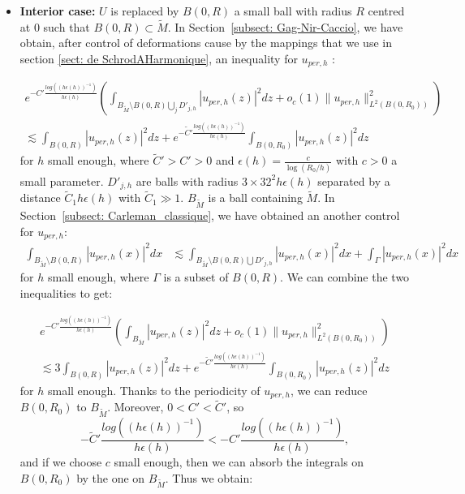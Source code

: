 \documentclass[leqno,11pt,letterpaper, english]{amsart}
\theoremstyle{plain}
\theoremstyle{definition}
\numberwithin{equation}{section}
\begin{document}
\begin{itemize}
	\item \textbf{Interior case:} $U$ is replaced by $B(0, R)$  a small ball with radius $R$ centred at $0$ such that $B(0, R) \subset \tilde{M}$. In Section~\ref{subsect: Gag-Nir-Caccio}, we have obtain, after control of deformations cause by the mappings that we use in section \ref{sect: de SchrodAHarmonique}, an inequality for $u_{per,h}$ :
    
		\begin{multline}
			e^{-C' \frac{log((h\epsilon(h))^{-1})}{h\epsilon(h)}}\left(\int_{B_{\tilde{M}}\setminus B(0,R)\bigcup_j D'_{j,h}}  |u_{per,h}(z)|^2 dz +o_c(1)\|u_{per,h}\|_{L^2(B(0,R_0))}^2 \right) \\   
			\lesssim \int_{B(0,R)} \left|u_{per,h}(z)\right|^2dz+e^{-\tilde{C}' \frac{log((h\epsilon(h))^{-1})}{h\epsilon(h)}}\int_{B(0,R_0)} \left|u_{per,h}(z)\right|^2dz
		\end{multline}
    for $h$ small enough, where $\tilde{C}' > C' > 0$ and $\epsilon(h)=\frac{c}{\log(R_0/h)}$ with $c>0$ a small parameter. $D'_{j,h}$ are balls with radius $3 \times 32^2 h\epsilon(h)$ separated by a distance $\tilde{C}_1 h\epsilon(h)$ with $\tilde{C}_1 \gg 1$. $B_{\tilde{M}}$ is a ball containing $\tilde{M}$. In Section~\ref{subsect: Carleman_classique}, we have obtained an another control for $u_{per,h}$: 
		\begin{align}
			\int_{B_{\tilde{M}}\setminus B(0,R)} | u_{per,h}(x)|^2 dx &\lesssim \int_{B_{ \tilde{M}}\setminus B(0,R)\bigcup D'_{j,h}} | u_{per,h}(x)|^2 dx +\int_{\Gamma}  |u_{per,h}(x)|^2 dx
		\end{align}
    for $h$ small enough, where $\Gamma$ is a subset of $B(0, R)$.
    We can combine the two inequalities to get: 
    
    \begin{multline}
    	e^{-C' \frac{log((h\epsilon(h))^{-1})}{h\epsilon(h)}}\left(\int_{B_{\tilde{M}}}  |u_{per,h}(z)|^2 dz +o_c(1)\|u_{per,h}\|_{L^2(B(0,R_0))}^2\right) \\   
    	\lesssim 3\int_{B(0,R)} \left|u_{per,h}(z)\right|^2dz+e^{-\tilde{C}' \frac{log((h\epsilon(h))^{-1})}{h\epsilon(h)}}\int_{B(0,R_0)} \left|u_{per,h}(z)\right|^2dz
    \end{multline}
    for $h$ small enough.
    Thanks to the periodicity of $u_{per,h}$, we can reduce $B(0,R_0)$ to $B_{\tilde{M}}$. Moreover, $0<C'<\tilde{C}'$, so $$ -\tilde{C}' \frac{log((h\epsilon(h))^{-1})}{h\epsilon(h)}<-C' \frac{log((h\epsilon(h))^{-1})}{h\epsilon(h)},$$ and if we choose $c$ small enough, then we can absorb the integrals on $B(0,R_0)$ by the one on $B_{\tilde{M}}$. Thus we obtain:
    

\end{itemize}
\end{document}

